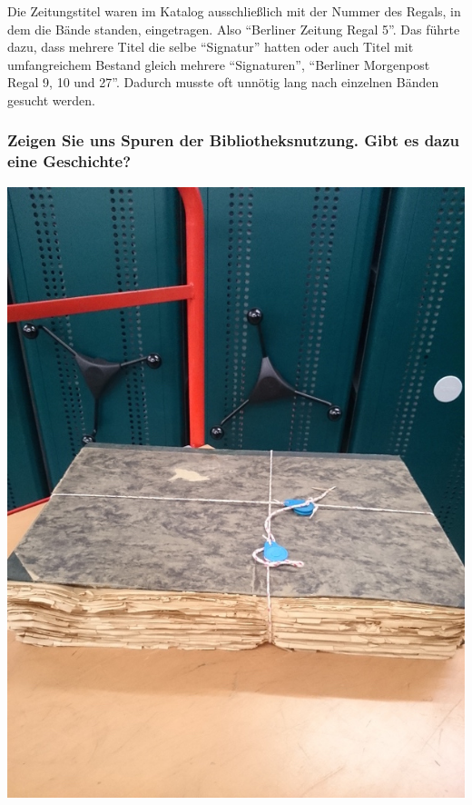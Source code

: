 Die Zeitungstitel waren im Katalog ausschließlich mit der Nummer des
Regals, in dem die Bände standen, eingetragen. Also \enquote{Berliner
Zeitung Regal 5}. Das führte dazu, dass mehrere Titel die selbe
\enquote{Signatur} hatten oder auch Titel mit umfangreichem Bestand
gleich mehrere \enquote{Signaturen}, \enquote{Berliner Morgenpost Regal
9, 10 und 27}. Dadurch musste oft unnötig lang nach einzelnen Bänden
gesucht werden.

\hypertarget{zeigen-sie-uns-spuren-der-bibliotheksnutzung.-gibt-es-dazu-eine-geschichte}{%
\subsubsection*{Zeigen Sie uns Spuren der Bibliotheksnutzung. Gibt es dazu eine
Geschichte?}\label{zeigen-sie-uns-spuren-der-bibliotheksnutzung.-gibt-es-dazu-eine-geschichte}}

\begin{center}
\includegraphics{landesarchiv/img/Zeitung-Schaden.jpg}
\end{center}

